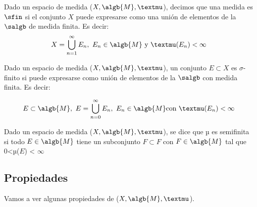\documentclass{apuntes}
\begin{document}
\begin{example}
\begin{defn}
Dado un espacio de medida ($X, \algb{M}, µ$), decimos que una medida es $\sfin$ si el conjunto $X$ puede expresarse como una unión de elementos de la $\salgb$ de medida finita. Es decir: \[X=\bigcup_{n=1}^{\infty}E_n, \ E_n \in \algb{M} \text{ y }µ(E_n)< \infty\]
\end{defn}

\begin{defn}
Dado un espacio de medida ($X, \algb{M}, µ$), un conjunto $E \subset X$ es $\sigma$-finito si puede expresarse como unión de elementos de la $\salgb$ con medida finita. Es decir:

\[E\subset \algb{M}, \ E=\bigcup_{n=0}^{\infty} E_n, \ E_n \in \algb{M} \text{con} \ µ(E_n)< \infty\]
\end{defn}

\begin{defn}
Dado un espacio de medida ($X, \algb{M}, µ$), se dice que µ es semifinita si todo $E\in \algb{M}$ tiene un subconjunto $F\subset F$ con $F\in \algb{M}$ tal que 0<µ($E$) < $\infty$
\end{defn}
\end{example}

\subsection{Propiedades}
Vamos a ver algunas propiedades de ($X, \algb{M}, µ$).
\end{document}
